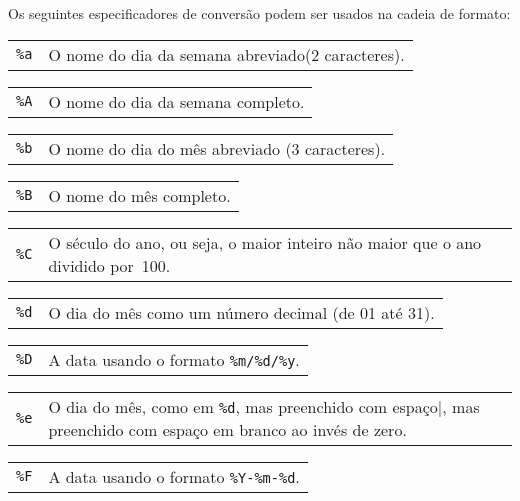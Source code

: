\documentclass[11pt, brazil]{report}
\begin{document}
Os seguintes especificadores de conversão podem ser usados na cadeia de formato:

\begin{tabular}{@{}p{20pt}p{421.5pt}@{}}
{\tt\%a}&O nome do dia da semana abreviado(2 caracteres).\\
\end{tabular}

\begin{tabular}{@{}p{20pt}p{421.5pt}@{}}
{\tt\%A}&O nome do dia da semana completo.\\
\end{tabular}

\begin{tabular}{@{}p{20pt}p{421.5pt}@{}}
{\tt\%b}&O nome do dia do mês abreviado (3 caracteres).\\
\end{tabular}

\begin{tabular}{@{}p{20pt}p{421.5pt}@{}}
{\tt\%B}&O nome do mês completo.\\
\end{tabular}

\begin{tabular}{@{}p{20pt}p{421.5pt}@{}}
{\tt\%C}&O século do ano, ou seja, o maior inteiro não maior que o
ano dividido por~100.\\
\end{tabular}

\begin{tabular}{@{}p{20pt}p{421.5pt}@{}}
{\tt\%d}&O dia do mês como um número decimal (de 01 até 31).\\
\end{tabular}

\begin{tabular}{@{}p{20pt}p{421.5pt}@{}}
{\tt\%D}&A data usando o formato \verb|%m/%d/%y|.\\
\end{tabular}

\begin{tabular}{@{}p{20pt}p{421.5pt}@{}}
{\tt\%e}&O dia do mês, como em \verb|%d|, mas preenchido com espaço
em branco ao invés de zero.\\
\end{tabular}

\begin{tabular}{@{}p{20pt}p{421.5pt}@{}}
{\tt\%F}&A data usando o formato \verb|%Y-%m-%d|.\\
\end{tabular}
\end{document}
